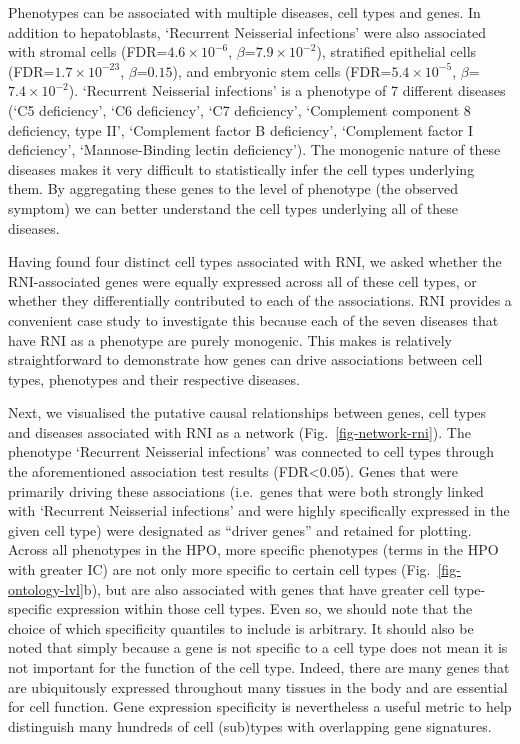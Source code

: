 \documentclass[
]{article}
\begin{document}
Phenotypes can be associated with multiple diseases, cell types and
genes. In addition to hepatoblasts, `Recurrent Neisserial infections'
were also associated with stromal cells (FDR=\(4.6 \times 10^{-6}\),
\(\beta\)=\(7.9 \times 10^{-2}\)), stratified epithelial cells
(FDR=\(1.7 \times 10^{-23}\), \(\beta\)=\(0.15\)), and embryonic stem
cells (FDR=\(5.4 \times 10^{-5}\), \(\beta\)=\(7.4 \times 10^{-2}\)).
`Recurrent Neisserial infections' is a phenotype of 7 different diseases
(`C5 deficiency', `C6 deficiency', `C7 deficiency', `Complement
component 8 deficiency, type II', `Complement factor B deficiency',
`Complement factor I deficiency', `Mannose-Binding lectin deficiency').
The monogenic nature of these diseases makes it very difficult to
statistically infer the cell types underlying them. By aggregating these
genes to the level of phenotype (the observed symptom) we can better
understand the cell types underlying all of these diseases.

Having found four distinct cell types associated with RNI, we asked
whether the RNI-associated genes were equally expressed across all of
these cell types, or whether they differentially contributed to each of
the associations. RNI provides a convenient case study to investigate
this because each of the seven diseases that have RNI as a phenotype are
purely monogenic. This makes is relatively straightforward to
demonstrate how genes can drive associations between cell types,
phenotypes and their respective diseases.

Next, we visualised the putative causal relationships between genes,
cell types and diseases associated with RNI as a network
(Fig.~\ref{fig-network-rni}). The phenotype `Recurrent Neisserial
infections' was connected to cell types through the aforementioned
association test results (FDR\textless0.05). Genes that were primarily
driving these associations (i.e.~genes that were both strongly linked
with `Recurrent Neisserial infections' and were highly specifically
expressed in the given cell type) were designated as ``driver genes''
and retained for plotting. Across all phenotypes in the HPO, more
specific phenotypes (terms in the HPO with greater IC) are not only more
specific to certain cell types (Fig.~\ref{fig-ontology-lvl}b), but are
also associated with genes that have greater cell type-specific
expression within those cell types. Even so, we should note that the
choice of which specificity quantiles to include is arbitrary. It should
also be noted that simply because a gene is not specific to a cell type
does not mean it is not important for the function of the cell type.
Indeed, there are many genes that are ubiquitously expressed throughout
many tissues in the body and are essential for cell function. Gene
expression specificity is nevertheless a useful metric to help
distinguish many hundreds of cell (sub)types with overlapping gene
signatures.
\end{document}
